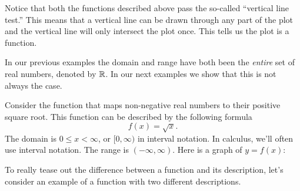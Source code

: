 \documentclass{ximera}
\begin{document}
Notice that both the functions described above pass the so-called
``vertical line test.''  This means that a vertical line can be drawn
through any part of the plot and the vertical line will only intersect
the plot once.  This tells us the plot is a function.

In our previous examples the domain and range have both been the
\textit{entire} set of real numbers, denoted by $\mathbb R$. In our next
examples we show that this is not always the case.

\begin{example}
Consider the function that maps non-negative real numbers to their
positive square root. This function can be described by the following
formula
\[
f(x) = \sqrt{x}.
\]
The domain is $0\le x<\infty$, or $[0,\infty)$ in interval notation.
  In calculus, we'll often use interval notation.  The range is
  $(-\infty,\infty)$.  Here is a graph of $y=f(x)$:
  
\begin{image}
\end{image}
\end{example}

To really tease out the difference between a function and its
description, let's consider an example of a function with two
different descriptions.
\end{document}
